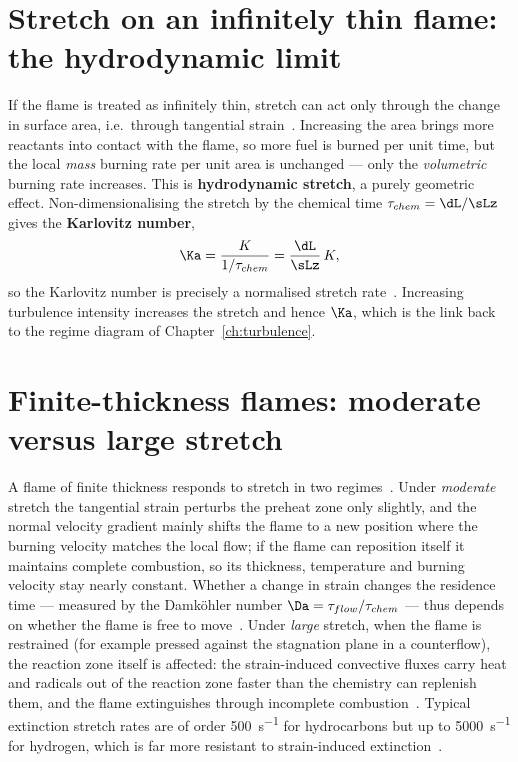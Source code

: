 \section{Stretch on an infinitely thin flame: the hydrodynamic limit}

If the flame is treated as infinitely thin, stretch can act only through the change in surface area, i.e.\ through tangential strain~\cite{lecture9,transcript_l9}. Increasing the area brings more reactants into contact with the flame, so more fuel is burned per unit time, but the local \emph{mass} burning rate per unit area is unchanged --- only the \emph{volumetric} burning rate increases. This is \textbf{hydrodynamic stretch}, a purely geometric effect. Non-dimensionalising the stretch by the chemical time $\tau_{chem}=\dL/\sLz$ gives the \textbf{Karlovitz number},
\begin{equation}
\Ka=\frac{K}{1/\tau_{chem}}=\frac{\dL}{\sLz}\,K ,
\label{eq:karlovitz-stretch}
\end{equation}
so the Karlovitz number is precisely a normalised stretch rate~\cite{lecture9,transcript_l9}. Increasing turbulence intensity increases the stretch and hence $\Ka$, which is the link back to the regime diagram of Chapter~\ref{ch:turbulence}.

\section{Finite-thickness flames: moderate versus large stretch}

A flame of finite thickness responds to stretch in two regimes~\cite{lecture9,transcript_l9}. Under \emph{moderate} stretch the tangential strain perturbs the preheat zone only slightly, and the normal velocity gradient mainly shifts the flame to a new position where the burning velocity matches the local flow; if the flame can reposition itself it maintains complete combustion, so its thickness, temperature and burning velocity stay nearly constant. Whether a change in strain changes the residence time --- measured by the Damk\"ohler number $\Da=\tau_{flow}/\tau_{chem}$ --- thus depends on whether the flame is free to move~\cite{lecture9}. Under \emph{large} stretch, when the flame is restrained (for example pressed against the stagnation plane in a counterflow), the reaction zone itself is affected: the strain-induced convective fluxes carry heat and radicals out of the reaction zone faster than the chemistry can replenish them, and the flame extinguishes through incomplete combustion~\cite{lecture9,transcript_l9}. Typical extinction stretch rates are of order \SI{500}{s^{-1}} for hydrocarbons but up to \SI{5000}{s^{-1}} for hydrogen, which is far more resistant to strain-induced extinction~\cite{transcript_l9}.

